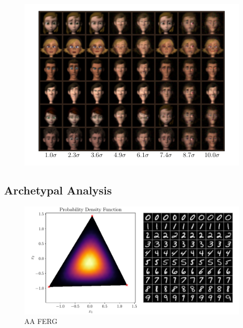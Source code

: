 \begin{figure}[htpb]
    \centering
    \includegraphics[width=0.8\linewidth]{figures/samples/ferg_people_inc_distance.pdf}
    \caption{}%
    \label{fig:}
\end{figure}

\subsection{Archetypal Analysis}%
\label{sub:archetypal_analysis}

\begin{figure}[htpb]
    \centering
    \includegraphics[width=1\linewidth]{figures/samples/aa_emnist.pdf}
    \caption{AA FERG}%
    \label{fig:aa_emnist}
\end{figure}

